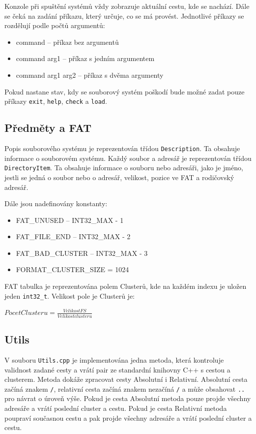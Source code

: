 \documentclass[12pt, a4paper]{article}
\begin{document}
Konzole při spuštění systémů vždy zobrazuje aktuální cestu, kde se nachází.
Dále se čeká na zadání příkazu, který určuje, co se má provést.
Jednotlivé příkazy se rozdělují podle počtů argumentů:
\begin{itemize}[itemsep=-4pt]
    \item command -- příkaz bez argumentů
    \item command arg1 -- příkaz s jedním argumentem
    \item command arg1 arg2 -- příkaz s dvěma argumenty
\end{itemize}

Pokud nastane stav, kdy se souborový systém poškodí bude možné zadat pouze příkazy \texttt{exit}, \texttt{help}, \texttt{check} a \texttt{load}.

\subsection{Předměty a FAT}
Popis souborového systému je reprezentován třídou \texttt{Description}. 
Ta obsahuje informace o souborovém systému.
Každý soubor a adresář je reprezentován třídou \texttt{DirectoryItem}.
Ta obsahuje informace o souboru nebo adresáři, jako je jméno, jestli se jedná o soubor nebo o adresář, velikost, pozice ve FAT a rodičovský adresář.

Dále jsou nadefinovány konstanty:
\begin{itemize}
    \item FAT\_UNUSED -- INT32\_MAX - 1
    \item FAT\_FILE\_END -- INT32\_MAX - 2
    \item FAT\_BAD\_CLUSTER -- INT32\_MAX - 3
    \item FORMAT\_CLUSTER\_SIZE = 1024
\end{itemize}

FAT tabulka je reprezentována polem Clusterů, kde na každém indexu je uložen jeden \texttt{int32\_t}.
Velikost pole je Clusterů je:
\begin{center}
    \large
    \begin{math}
        Pocet Clusteru = \frac{Velikost FS}{Velikost clusteru}
    \end{math}
\end{center}

\subsection{Utils}
V souboru \texttt{Utils.cpp} je implementována jedna metoda, 
která kontroluje validnost zadané cesty a vrátí pair ze standardní knihovny C++ s cestou a clusterem.
Metoda dokáže zpracovat cesty Absolutní i Relativní.
Absolutní cesta začíná znakem \texttt{/}, relativní cesta začíná znakem nezačíná \texttt{/} a může obsahovat \texttt{..} pro návrat o úroveň výše.
Pokud je cesta Absolutní metoda pouze projde všechny adresáře a vrátí poslední cluster a cestu.
Pokud je cesta Relativní metoda poupraví současnou cestu a pak projde všechny adresáře a vrátí poslední cluster a cestu.
\end{document}
